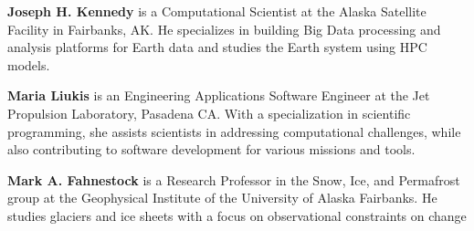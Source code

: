 \documentclass[
  super,
  preprint,
  3p,
  twocolumn]{elsarticle}
\begin{document}
\textbf{Joseph H. Kennedy} is a Computational Scientist at the Alaska
Satellite Facility in Fairbanks, AK. He specializes in building Big Data
processing and analysis platforms for Earth data and studies the Earth
system using HPC models.

\textbf{Maria Liukis} is an Engineering Applications Software Engineer
at the Jet Propulsion Laboratory, Pasadena CA. With a specialization in
scientific programming, she assists scientists in addressing
computational challenges, while also contributing to software
development for various missions and tools.

\textbf{Mark A. Fahnestock} is a Research Professor in the Snow, Ice,
and Permafrost group at the Geophysical Institute of the University of
Alaska Fairbanks. He studies glaciers and ice sheets with a focus on
observational constraints on change


\renewcommand\refname{References}
  
\end{document}
